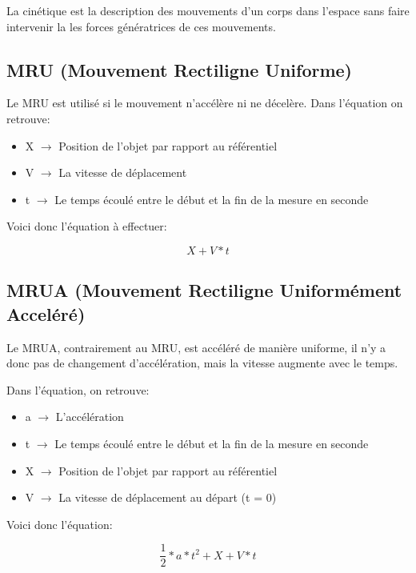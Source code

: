 \documentclass{article}
\begin{document}
La cinétique est la description des mouvements d'un corps dans l'espace sans faire
intervenir la les forces génératrices de ces mouvements.

\subsection{MRU (Mouvement Rectiligne Uniforme)}

Le MRU est utilisé si le mouvement n'accélère ni ne décelère. Dans l'équation on retrouve:
\begin{itemize}
	\item X $\rightarrow$ Position de l'objet par rapport au référentiel
	\item V $\rightarrow$ La vitesse de déplacement
	\item t $\rightarrow$ Le temps écoulé entre le début et la fin de la mesure en seconde
\end{itemize}

Voici donc l'équation à effectuer:

\begin{equation}
  X + V * t
\end{equation}

\subsection{MRUA (Mouvement Rectiligne Uniformément Acceléré)}

Le MRUA, contrairement au MRU, est accéléré de manière uniforme, il n'y a donc pas de changement d'accélération, mais la vitesse augmente avec le temps.

Dans l'équation, on retrouve:
\begin{itemize}
	\item a $\rightarrow$ L'accélération
	\item t $\rightarrow$ Le temps écoulé entre le début et la fin de la mesure en seconde
	\item X $\rightarrow$ Position de l'objet par rapport au référentiel
	\item V $\rightarrow$ La vitesse de déplacement au départ (t = 0)
\end{itemize}

Voici donc l'équation:

\begin{equation}
	\frac{1}{2} * a * t^2 + X + V * t
\end{equation}
\end{document}
